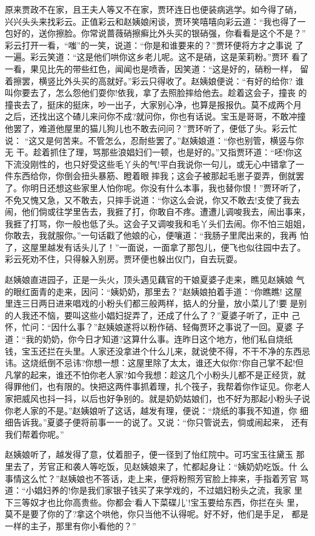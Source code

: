 原来贾政不在家，且王夫人等又不在家，贾环连日也便装病逃学。如今得了硝，
兴兴头头来找彩云。正值彩云和赵姨娘闲谈，贾环笑嘻嘻向彩云道：“我也得了一
包好的，送你擦脸。你常说蔷薇硝擦癣比外头买的银硝强，你看看是这个不是？”
彩云打开一看，“嗤”的一笑，说道：“你是和谁要来的？”贾环便将方才之事说
了一遍。彩云笑道：“这是他们哄你这乡老儿呢。这不是硝，这是茉莉粉。”贾环
看了一看，果见比先的带些红色，闻闻也是喷香，因笑道：“这是好的，硝粉一样，
留着擦罢，横竖比外头买的高就好。”彩云只得收了。赵姨娘便说：“有好的给你?
谁叫你要去了，怎么怨他们耍你!依我，拿了去照脸摔给他去。趁着这会子，撞丧
的撞丧去了，挺床的挺床，吵一出子，大家别心净，也算是报报仇。莫不成两个月
之后，还找出这个碴儿来问你不成?就问你，你也有话说。宝玉是哥哥，不敢冲撞
他罢了，难道他屋里的猫儿狗儿也不敢去问问？”贾环听了，便低了头。彩云忙说：
“这又是何苦来。不管怎么，忍耐些罢了。”赵姨娘道：“你也别管，横竖与你无
干。趁着抓住了理，骂那些浪娼妇们一顿，也是好的。”又指贾环道：“呸!你这
下流没刚性的，也只好受这些毛丫头的气!平白我说你一句儿，或无心中错拿了一
件东西给你，你倒会扭头暴筋、瞪着眼摔我；这会子被那起毛崽子耍弄，倒就罢
了。你明日还想这些家里人怕你呢。你没有什么本事，我也替你恨！”贾环听了，
不免又愧又急，又不敢去，只摔手说道：“你这么会说，你又不敢去!支使了我去
闹，他们倘或往学里告去，我捱了打，你敢自不疼。遭遭儿调唆我去，闹出事来，
我捱了打骂，你一般也低了头。这会子又调唆我和毛丫头们去闹。你不怕三姐姐，
你敢去，我就服你。”一句话戳了他娘的心，便嚷道：“我肠子里爬出来的，我再
怕了，这屋里越发有话头儿了！”一面说，一面拿了那包儿，便飞也似往园中去了。
彩云死劝不住，只得躲入别房。贾环便也躲出仪门，自去玩耍。

赵姨娘直进园子，正是一头火，顶头遇见藕官的干娘夏婆子走来，瞧见赵姨娘
气的眼红面青的走来，因问：“姨奶奶，那里去？”赵姨娘拍着手道：“你瞧瞧!
这屋里连三日两日进来唱戏的小粉头们都三般两样，掂人的分量，放小菜儿了!要
是别的人我还不恼，要叫这些小娼妇捉弄了，还成了什么了？”夏婆子听了，正中
己怀，忙问：“因什么事？”赵姨娘遂将以粉作硝、轻侮贾环之事说了一回。夏婆
子道：“我的奶奶，你今日才知道?这算什么事。连昨日这个地方，他们私自烧纸
钱，宝玉还拦在头里。人家还没拿进个什么儿来，就说使不得，不干不净的东西忌
讳。这烧纸倒不忌讳?你想一想：这屋里除了太太，谁还大似你?你自己掌不起!但
凡掌的起来，谁还不怕你老人家?如今我想：趁这几个小粉头儿都不是正经货，就
得罪他们，也有限的。快把这两件事抓着理，扎个筏子，我帮着你作证见。你老人
家把威风也抖一抖，以后也好争别的。就是奶奶姑娘们，也不好为那起小粉头子说
你老人家的不是。”赵姨娘听了这话，越发有理，便说：“烧纸的事我不知道，你
细细告诉我。”夏婆子便将前事一一的说了。又说：“你只管说去，倘或闹起来，
还有我们帮着你呢。”

赵姨娘听了，越发得了意，仗着胆子，便一径到了怡红院中。可巧宝玉往黛玉
那里去了，芳官正和袭人等吃饭，见赵姨娘来了，忙都起身让：“姨奶奶吃饭。什
么事情这么忙？”赵姨娘也不答话，走上来，便将粉照芳官脸上摔来，手指着芳官
骂道：“小娼妇养的!你是我们家银子钱买了来学戏的，不过娼妇粉头之流，我家
里下三等奴才也比你高贵些。你都会‘看人下菜碟儿’!宝玉要给东西，你拦在头
里，莫不是要了你的了?拿这个哄他，你只当他不认得呢。好不好，他们是手足，
都是一样的主子，那里有你小看他的？”

